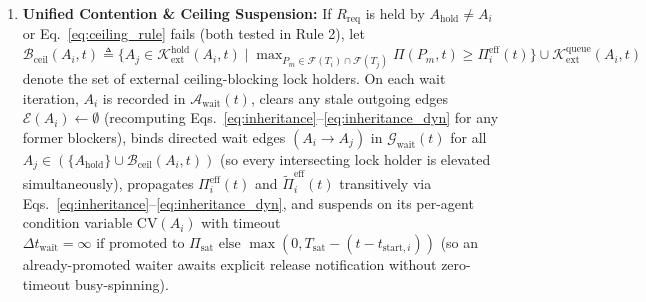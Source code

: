\documentclass[conference,10pt]{IEEEtran}
\begin{document}
\begin{enumerate}
    \item \textbf{Unified Contention \& Ceiling Suspension:} If $R_{\text{req}}$ is held by $A_{\text{hold}} \ne A_i$ or Eq.~\eqref{eq:ceiling_rule} fails (both tested in Rule 2), let $\mathcal{B}_{\text{ceil}}(A_i, t) \triangleq \{A_j \in \mathcal{K}_{\text{ext}}^{\text{hold}}(A_i, t) \mid \max_{P_m \in \mathcal{F}(T_i) \cap \mathcal{F}(T_j)} \Pi(P_m, t) \ge \Pi_i^{\text{eff}}(t)\} \cup \mathcal{K}_{\text{ext}}^{\text{queue}}(A_i, t)$ denote the set of external ceiling-blocking lock holders. On each wait iteration, $A_i$ is recorded in $\mathcal{A}_{\text{wait}}(t)$, clears any stale outgoing edges $\mathcal{E}(A_i) \leftarrow \emptyset$ (recomputing Eqs.~\eqref{eq:inheritance}--\eqref{eq:inheritance_dyn} for any former blockers), binds directed wait edges $(A_i \to A_j)$ in $\mathcal{G}_{\text{wait}}(t)$ for all $A_j \in (\{A_{\text{hold}}\} \cup \mathcal{B}_{\text{ceil}}(A_i, t))$ (so every intersecting lock holder is elevated simultaneously), propagates $\Pi_i^{\text{eff}}(t)$ and $\tilde{\Pi}_i^{\text{eff}}(t)$ transitively via Eqs.~\eqref{eq:inheritance}--\eqref{eq:inheritance_dyn}, and suspends on its per-agent condition variable $\text{CV}(A_i)$ with timeout $\Delta t_{\text{wait}} = \infty \text{ if promoted to } \Pi_{\text{sat}} \text{ else } \max(0, T_{\text{sat}} - (t - t_{\text{start},i}))$ (so an already-promoted waiter awaits explicit release notification without zero-timeout busy-spinning).
\end{enumerate}
\end{document}
